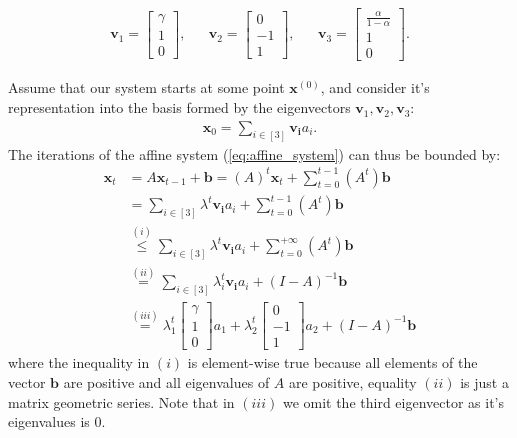     \begin{align*}
        \bm{v}_1 = \begin{bmatrix}
            \gamma \\ 1 \\ 0
        \end{bmatrix}, &&
        \bm{v}_2 = \begin{bmatrix}
            0 \\ -1 \\ 1
        \end{bmatrix}, &&
        \bm{v}_3 = \begin{bmatrix}
            \frac{\alpha}{1 - \alpha} \\ 1 \\ 0
        \end{bmatrix}.
    \end{align*}

    Assume that our system starts at some point $\bm{x}^{(0)}$, and consider it's representation into the basis formed by the eigenvectors $\bm{v}_1,\bm{v}_2,\bm{v}_3$:
    \begin{align*}
        \bm{x}_0 = \sum_{i\in [3]} \bm{v_i}a_i.
    \end{align*}
    The iterations of the affine system (\ref{eq:affine_system}) can thus be bounded by:
    \begin{align*}
        \bm{x}_{t} 
        &= A\bm{x}_{t-1} + \bm{b} = (A)^t \bm{x}_t + \sum_{t=0}^{t-1}(A^t)\bm{b}\\
        &= \sum_{i\in [3]} \lambda^t \bm{v_i} a_i + \sum_{t=0}^{t-1}(A^t)\bm{b}\\
        &\stackrel{(i)}{\leq} \sum_{i\in [3]} \lambda^t \bm{v_i} a_i + \sum_{t=0}^{+\infty}(A^t)\bm{b}\\
        &\stackrel{(ii)}{=} \sum_{i\in [3]} \lambda_i^t \bm{v_i} a_i + (I-A)^{-1}\bm{b}\\
        &\stackrel{(iii)}{=} \lambda_1^t \begin{bmatrix}
            \gamma \\ 1 \\ 0
        \end{bmatrix} a_1
         + \lambda_2^t   \begin{bmatrix}
            0 \\ -1 \\ 1
        \end{bmatrix} a_2 +  (I-A)^{-1}\bm{b}
    \end{align*}
    where the inequality in $(i)$ is element-wise true because all elements of the vector $\bm{b}$ are positive and all eigenvalues of $A$ are positive, equality $(ii)$ is just a matrix geometric series. Note that in $(iii)$ we omit the third eigenvector as it's eigenvalues is $0$. \\

